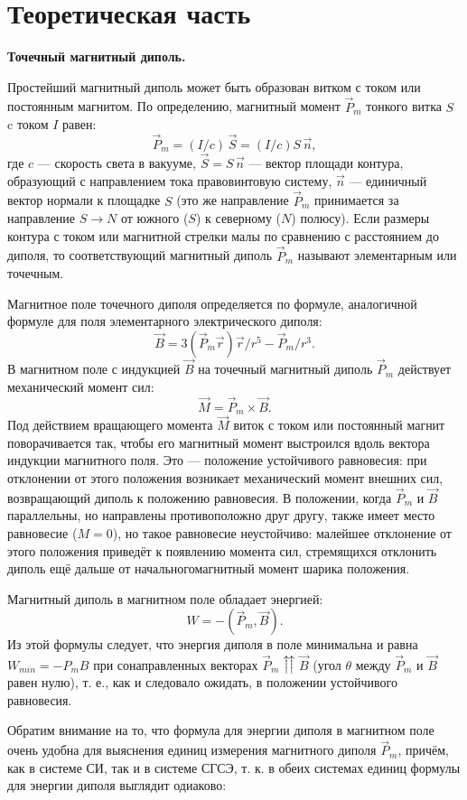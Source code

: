 \documentclass[a4paper, fontsize=14pt]{article}
\begin{document}
	\section*{Теоретическая часть}
	\textbf{Точечный магнитный диполь.}
	
	Простейший магнитный диполь может быть образован витком с током или постоянным магнитом. По определению, магнитный момент $\vec P_m$ тонкого витка $S$ c током $I$ равен:
\[
	\vec P_m = (I/c)\, \vec S = (I/c) S\, \vec n,
\]
где $c$ --- скорость света в вакууме, $\vec S = S \, \vec n$ --- вектор площади контура, образующий с направлением тока правовинтовую систему, $\vec n$ --- единичный вектор нормали к площадке $S$ (это же направление $\vec P_m$ принимается за направление $S \longrightarrow N$ от южного ($S$) к северному ($N$) полюсу). Если размеры контура с током или магнитной стрелки малы по сравнению с расстоянием до диполя, то соответствующий магнитный диполь $\vec P_m$ называют элементарным или точечным.

Магнитное поле точечного диполя определяется по формуле, аналогичной формуле для поля элементарного электрического диполя:
\[
	\vec B = 3 (\vec P_m \vec r) \vec r / r^5 - \vec P_m / r^3.
\]
	В магнитном поле с индукцией $\vec B$ на точечный магнитный диполь $\vec P_m$ действует механический момент сил:
\[
	\vec M = \vec P_m \times \vec B.
\]
	Под действием вращающего момента $\vec M$ виток с током или постоянный магнит поворачивается так, чтобы его магнитный момент выстроился вдоль вектора индукции магнитного поля. Это --- положение устойчивого равновесия: при отклонении от этого положения возникает механический момент внешних сил, возвращающий диполь к положению равновесия. В положении, когда $\vec P_m$ и $\vec B$ параллельны, но направлены противоположно друг другу, также имеет место равновесие ($M = 0$), но такое равновесие неустойчиво: малейшее отклонение от этого положения приведёт к появлению момента сил, стремящихся отклонить диполь ещё дальше от начальногомагнитный момент шарика положения.
	
	Магнитный диполь в магнитном поле обладает энергией:
	\[
		W = - (\vec P_m , \vec B).
	\]
	Из этой формулы следует, что энергия диполя в поле минимальна и равна $W_{min} = - P_m B$ при сонаправленных векторах $\vec P_m \upuparrows \vec B$ (угол $\theta$ между $\vec P_m$ и $\vec B$ равен нулю), т. е., как и следовало ожидать, в положении устойчивого равновесия.
	
	Обратим внимание на то, что формула для энергии диполя в магнитном поле очень удобна для выяснения единиц измерения магнитного диполя $\vec P_m$, причём, как в системе СИ, так и в системе СГСЭ, т. к. в обеих системах единиц формулы для энергии диполя выглядит одиаково:
	
\end{document}
